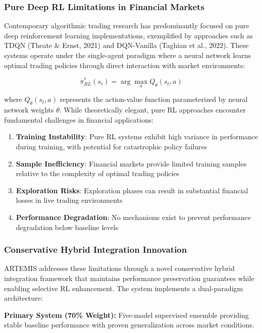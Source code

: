 \documentclass[10pt,twocolumn]{article}
\begin{document}
\subsubsection{Pure Deep RL Limitations in Financial Markets}

Contemporary algorithmic trading research has predominantly focused on pure deep reinforcement learning implementations, exemplified by approaches such as TDQN (Theate \& Ernst, 2021) and DQN-Vanilla (Taghian et al., 2022). These systems operate under the single-agent paradigm where a neural network learns optimal trading policies through direct interaction with market environments:

\begin{equation}
\pi^*_{RL}(s_t) = \arg\max_{a} Q_\theta(s_t, a)
\end{equation}

where $Q_\theta(s_t, a)$ represents the action-value function parameterized by neural network weights $\theta$. While theoretically elegant, pure RL approaches encounter fundamental challenges in financial applications:

\begin{enumerate}[itemsep=1pt]
\item \textbf{Training Instability}: Pure RL systems exhibit high variance in performance during training, with potential for catastrophic policy failures
\item \textbf{Sample Inefficiency}: Financial markets provide limited training samples relative to the complexity of optimal trading policies
\item \textbf{Exploration Risks}: Exploration phases can result in substantial financial losses in live trading environments
\item \textbf{Performance Degradation}: No mechanisms exist to prevent performance degradation below baseline levels
\end{enumerate}

\subsubsection{Conservative Hybrid Integration Innovation}

ARTEMIS addresses these limitations through a novel conservative hybrid integration framework that maintains performance preservation guarantees while enabling selective RL enhancement. The system implements a dual-paradigm architecture:

\textbf{Primary System (70\% Weight):} Five-model supervised ensemble providing stable baseline performance with proven generalization across market conditions.
\end{document}
